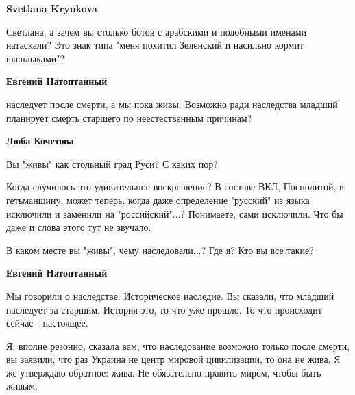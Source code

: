 \begin{itemize}
\begin{itemize}
 
\textbf{Svetlana Kryukova} 

Светлана, а зачем вы столько ботов с арабскими и подобными именами натаскали?
Это знак типа "меня похитил Зеленский и насильно кормит шашлыками"?


 
\textbf{Евгений Натоптанный} 

наследует после смерти, а мы пока живы. Возможно ради наследства младший
планирует смерть старшего по неестественным причинам?

 
\textbf{Люба Кочетова} 

Вы "живы" как стольный град Руси? С каких пор?

Когда случилось это удивительное воскрешение? В составе ВКЛ, Посполитой, в
гетьманщину, может теперь. когда даже определение "русский" из языка исключили
и заменили на "российский"...? Понимаете, сами исключили. Что бы даже и слова
этого тут не звучало.

В каком месте вы "живы", чему наследовали...? Где я? Кто вы все такие?


 
\textbf{Евгений Натоптанный} 

Мы говорили о наследстве. Историческое наследие. Вы сказали, что младший
наследует за старшим. История это, то что уже прошло. То что происходит сейчас
- настоящее. 

Я, вполне резонно, сказала вам, что наследование возможно только после смерти,
вы заявили, что раз Украина не центр мировой цивилизации, то она не жива. Я же
утверждаю обратное: жива. Не обязательно править миром, чтобы быть живым. 


\end{itemize}
\end{itemize}
